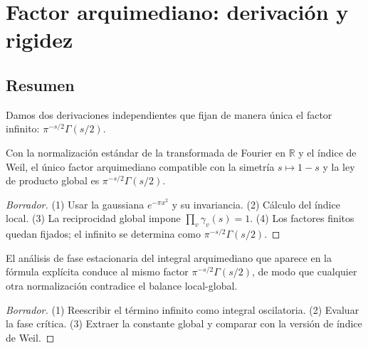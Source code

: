 \section{Factor arquimediano: derivación y rigidez}

\subsection*{Resumen}
Damos dos derivaciones independientes que fijan de manera única el factor infinito:
$\pi^{-s/2}\Gamma(s/2)$.

\begin{theorem}
Con la normalización estándar de la transformada de Fourier en $\mathbb{R}$ y el índice
de Weil, el único factor arquimediano compatible con la simetría $s\mapsto 1-s$ y la
ley de producto global es $\pi^{-s/2}\Gamma(s/2)$.
\end{theorem}

\begin{proof}[Borrador]
(1) Usar la gaussiana $e^{-\pi x^2}$ y su invariancia. (2) Cálculo del índice local.
(3) La reciprocidad global impone $\prod_v \gamma_v(s)=1$. (4) Los factores finitos
quedan fijados; el infinito se determina como $\pi^{-s/2}\Gamma(s/2)$.
\end{proof}

\begin{theorem}
El análisis de fase estacionaria del integral arquimediano que aparece en la fórmula
explícita conduce al mismo factor $\pi^{-s/2}\Gamma(s/2)$, de modo que cualquier
otra normalización contradice el balance local-global.
\end{theorem}

\begin{proof}[Borrador]
(1) Reescribir el término infinito como integral oscilatoria. (2) Evaluar la fase crítica.
(3) Extraer la constante global y comparar con la versión de índice de Weil.
\end{proof}
